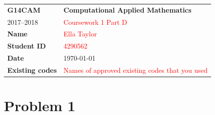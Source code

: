 \documentclass[a4paper,12pt,onecolumn,final]{article}
\begin{document}


\noindent
\begin{tabular}{|p{}|p{}|}
\hline
\textbf{G14CAM} & \textbf{Computational Applied Mathematics}
\\
2017--2018 & \textcolor{red}{Coursework 1 Part D}
\\
\hline
\textbf{Name} & \textcolor{red}{Ella Taylor}
\\ 
\textbf{Student ID} & \textcolor{red}{4290562}
\\ 
\textbf{Date} & \today
\\
\hline
\textbf{Existing codes} & \textcolor{red}{Names of approved existing codes that you used}
\\
\hline
\end{tabular}
\section*{Problem 1}
\end{document}
